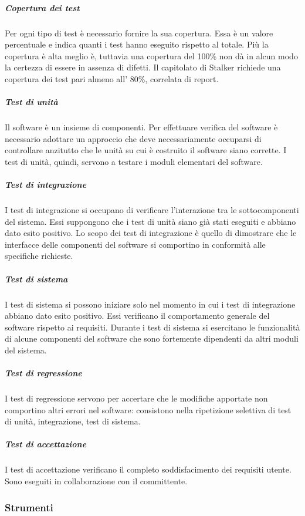 \documentclass[../norme-di-progetto.tex]{subfiles}
\begin{document}
\subparagraph{Copertura dei test}%
\label{subp:copertura_dei_test}
Per ogni tipo di test è necessario fornire la sua copertura.
Essa è un valore percentuale e indica quanti  i test hanno eseguito rispetto al totale.
Più la copertura è alta meglio è, tuttavia una copertura del 100\% non dà in alcun modo la certezza di essere in assenza di difetti.
Il capitolato di Stalker richiede una copertura dei test pari almeno all' 80\%, correlata di report.

\subparagraph{Test di unità}%
\label{subp:test_di_unita}
Il software è un insieme di componenti. Per effettuare verifica del software è necessario adottare un approccio  che deve necessariamente occuparsi di controllare anzitutto che le unità su cui è costruito il software siano corrette. I test di unità, quindi, servono a testare i moduli elementari del software.

\subparagraph{Test di integrazione}%
\label{subp:test_di_integrazione}
I test di integrazione si occupano di verificare l'interazione tra le sottocomponenti del sistema.
Essi suppongono che i test di unità siano già stati eseguiti e abbiano dato esito positivo.
Lo scopo dei test di integrazione è quello di dimostrare che le interfacce delle componenti del software si comportino in conformità alle specifiche richieste.

\subparagraph{Test di sistema}%
\label{test_di_sistema}
I test di sistema si possono iniziare solo nel momento in cui i test di integrazione abbiano dato esito positivo.
Essi verificano il comportamento generale del software rispetto ai requisiti.
Durante i test di sistema si esercitano le funzionalità di alcune componenti del software che sono fortemente dipendenti da altri moduli del sistema.

\subparagraph{Test di regressione}%
\label{test_di_regressione}
I test di regressione servono per accertare che le modifiche apportate non comportino altri errori nel software: consistono nella ripetizione selettiva di test di unità, integrazione, test di sistema.

\subparagraph{Test di accettazione}%
\label{test_di_accettazione}
I test di accettazione verificano il completo soddisfacimento dei requisiti utente.
Sono eseguiti in collaborazione con il committente.

\subsubsection{Strumenti}%
\label{subs:verifica/strumenti}
\end{document}
